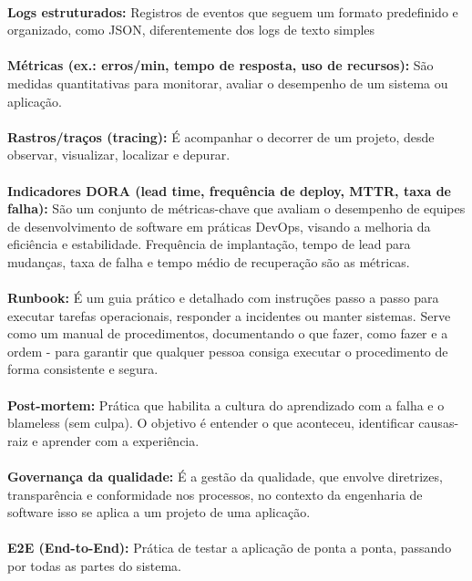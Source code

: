 \documentclass{article}
\begin{document}
\paragraph{}
\textbf{Logs estruturados:} Registros de eventos que seguem um formato predefinido e organizado, como JSON, diferentemente dos logs de texto simples

\paragraph{}
\textbf{Métricas (ex.: erros/min, tempo de resposta, uso de recursos):} São medidas quantitativas para monitorar, avaliar o desempenho de um sistema ou aplicação.

\paragraph{}
\textbf{Rastros/traços (tracing):} É acompanhar o decorrer de um projeto, desde observar, visualizar, localizar e depurar.

\paragraph{}
\textbf{Indicadores DORA (lead time, frequência de deploy, MTTR, taxa de falha):} São um conjunto de métricas-chave que avaliam o desempenho de equipes de desenvolvimento de software em práticas DevOps, visando a melhoria da eficiência e estabilidade. Frequência de implantação, tempo de lead para mudanças, taxa de falha e tempo médio de recuperação são as métricas.

\paragraph{}
\textbf{Runbook:} É um guia prático e detalhado com instruções passo a passo para executar tarefas operacionais, responder a incidentes ou manter sistemas. Serve como um manual de procedimentos, documentando o que fazer, como fazer e a ordem - para garantir que qualquer pessoa consiga executar o procedimento de forma consistente e segura.

\paragraph{}
\textbf{Post-mortem:} Prática que habilita a cultura do aprendizado com a falha e o blameless (sem culpa). O objetivo é entender o que aconteceu, identificar causas-raiz e aprender com a experiência.

\paragraph{}
\textbf{Governança da qualidade:} É a gestão da qualidade, que envolve diretrizes, transparência e conformidade nos processos, no contexto da engenharia de software isso se aplica a um projeto de uma aplicação.

\paragraph{}
\textbf{E2E (End-to-End):} Prática de testar a aplicação de ponta a ponta, passando por todas as partes do sistema.
\end{document}

